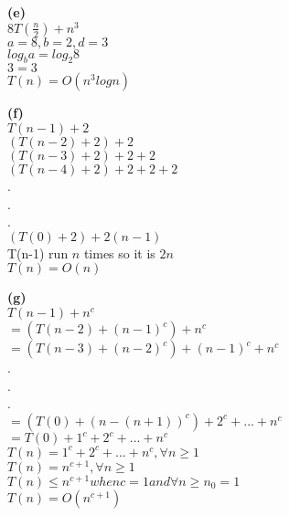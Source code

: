 \documentclass[a4paper, 11pt]{article}
\renewcommand{\part}[1] {\vspace{.10in} {\bf (#1)}}
\begin{document}
\part{e}\\
$8T(\frac{n}{2})+n^{3}$\\
$a=8, b=2, d=3$\\
$log_{b}a = log_{2}8$\\
$3 = 3$\\
$T(n)=O(n^{3}logn)$

\part{f}\\
$T(n-1)+2$\\
$(T(n-2)+2)+2$\\
$(T(n-3)+2)+2+2$\\
$(T(n-4)+2)+2+2+2$\\
.\\
.\\
.\\
$(T(0)+2)+2(n-1)$\\
T(n-1) run $n$ times so it is $2n$\\
$T(n)=O(n)$

\part{g}\\
$T(n-1)+n^{c}$\\
$=(T(n-2)+(n-1)^{c})+n^{c}$\\
$=(T(n-3)+(n-2)^{c})+(n-1)^{c}+n^{c}$\\
.\\
.\\
.\\
$=(T(0)+(n-(n+1))^{c})+2^{c}+...+n^{c}$\\
$=T(0)+1^{c}+2^{c}+...+n^{c}$\\
$T(n)=1^{c}+2^{c}+...+n^{c}, \forall n \geq 1$\\
$T(n)=n^{c+1}, \forall n \geq 1$\\
$T(n) \leq n^{c+1} when c = 1 and \forall n \geq n_{0} = 1$\\
$T(n)=O(n^{c+1})$
\end{document}
